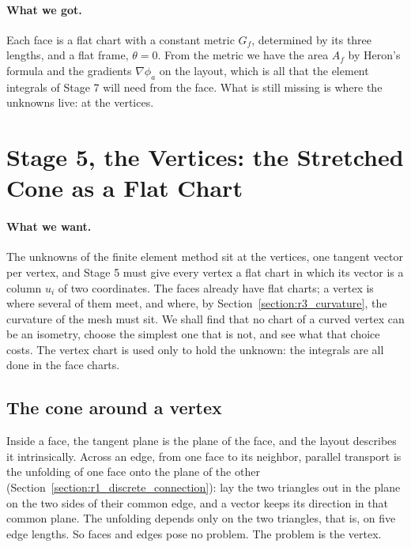 \paragraph{What we got.} Each face is a flat chart with a constant metric $G_f$, determined by its three lengths, and a flat frame, $\theta = 0$. From the metric we have the area $A_f$ by Heron's formula and the gradients $\nabla\phi_a$ on the layout, which is all that the element integrals of Stage 7 will need from the face. What is still missing is where the unknowns live: at the vertices.

\section{Stage 5, the Vertices: the Stretched Cone as a Flat Chart}
\label{section:int_vertex}

\paragraph{What we want.} The unknowns of the finite element method sit at the vertices, one tangent vector per vertex, and Stage 5 must give every vertex a flat chart in which its vector is a column $u_i$ of two coordinates. The faces already have flat charts; a vertex is where several of them meet, and where, by Section~\ref{section:r3_curvature}, the curvature of the mesh must sit. We shall find that no chart of a curved vertex can be an isometry, choose the simplest one that is not, and see what that choice costs. The vertex chart is used only to hold the unknown: the integrals are all done in the face charts.

\subsection{The cone around a vertex}

Inside a face, the tangent plane is the plane of the face, and the layout describes it intrinsically. Across an edge, from one face to its neighbor, parallel transport is the unfolding of one face onto the plane of the other (Section~\ref{section:r1_discrete_connection}): lay the two triangles out in the plane on the two sides of their common edge, and a vector keeps its direction in that common plane. The unfolding depends only on the two triangles, that is, on five edge lengths. So faces and edges pose no problem. The problem is the vertex.

